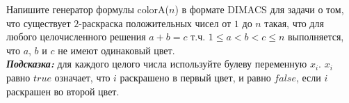 \documentclass[12pt]{extreport}
\theoremstyle{definiton}
\theoremstyle{definition}
\theoremstyle{definition}
\let\leq\leqslant
\begin{document}
	

			
\Pr[10 баллов] Напишите генератор формулы colorA($n$) в формате DIMACS для задачи о том, что существует $2$-раскраска положительных чисел от $1$ до $n$ такая, что для любого целочисленного решения $a + b = c$ т.ч. $1 \leq a < b < c \leq n$ выполняется, что $a$, $b$ и $c$ не имеют одинаковый цвет.\\
\textbf{\textit{Подсказка:}} для каждого целого числа используйте булеву переменную $x_i$. $x_i$ равно $true$ означает, что $i$ раскрашено в первый цвет, и равно $false$, если $i$ раскрашен во второй цвет.
			
\end{document}
